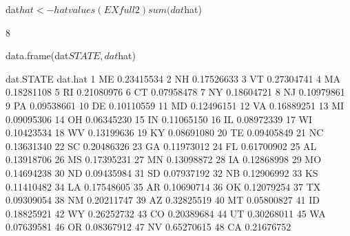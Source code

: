 \begin{Schunk}
\begin{Sinput}
 dat$hat <- hatvalues(EXfull2)
 sum(dat$hat)
\end{Sinput}
\begin{Soutput}
[1] 8
\end{Soutput}
\begin{Sinput}
 data.frame(dat$STATE, dat$hat)
\end{Sinput}
\begin{Soutput}
   dat.STATE    dat.hat
1         ME 0.23415534
2         NH 0.17526633
3         VT 0.27304741
4         MA 0.18281108
5         RI 0.21080976
6         CT 0.07958478
7         NY 0.18604721
8         NJ 0.10979861
9         PA 0.09538661
10        DE 0.10110559
11        MD 0.12496151
12        VA 0.16889251
13        MI 0.09095306
14        OH 0.06345230
15        IN 0.11065150
16        IL 0.08972339
17        WI 0.10423534
18        WV 0.13199636
19        KY 0.08691080
20        TE 0.09405849
21        NC 0.13631340
22        SC 0.20486326
23        GA 0.11973012
24        FL 0.61700902
25        AL 0.13918706
26        MS 0.17395231
27        MN 0.13098872
28        IA 0.12868998
29        MO 0.14694238
30        ND 0.09435984
31        SD 0.07937192
32        NB 0.12906992
33        KS 0.11410482
34        LA 0.17548605
35        AR 0.10690714
36        OK 0.12079254
37        TX 0.09309054
38        NM 0.20211747
39        AZ 0.32825519
40        MT 0.05800827
41        ID 0.18825921
42        WY 0.26252732
43        CO 0.20389684
44        UT 0.30268011
45        WA 0.07639581
46        OR 0.08367912
47        NV 0.65270615
48        CA 0.21676752
\end{Soutput}
\end{Schunk}
